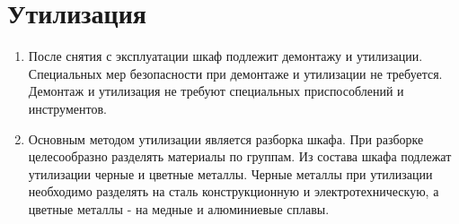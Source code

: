 \color{unidarkgreen}\section[Утилизация]{Утилизация}\color{black}

\begin{enumerate}[label=\arabic{section}.\arabic*, align=left, labelsep=4pt, leftmargin=0pt, itemindent=2cm]

\item
После снятия с эксплуатации шкаф подлежит демонтажу и утилизации. 
Специальных мер безопасности при демонтаже и утилизации не требуется. 
Демонтаж и утилизация не требуют специальных приспособлений и инструментов.

\item
Основным методом утилизации является разборка шкафа. 
При разборке целесообразно разделять материалы по группам. 
Из состава шкафа подлежат утилизации черные и цветные металлы. 
Черные металлы при утилизации необходимо разделять на сталь конструкционную и электротехническую, а цветные металлы - на медные и алюминиевые сплавы.

\end{enumerate}